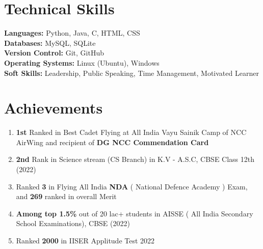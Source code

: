 \documentclass[a4paper,20pt]{article}
\begin{document}
\section{Technical Skills }
\vspace{2pt}

\textbf{Languages: }\hspace{0.1cm} \normalfont Python, Java, C, HTML, CSS\\
\textbf{Databases: }\hspace{0.1cm} \normalfont MySQL, SQLite\\
\textbf{Version Control: }\hspace{0.1cm} \normalfont Git, GitHub\\
\textbf{Operating Systems: }\hspace{0.1cm} \normalfont Linux (Ubuntu), Windows\\
\textbf{Soft Skills: }\hspace{0.1cm} \normalfont Leadership, Public Speaking, Time Management, Motivated Learner\\


\vspace{-5pt} 
\section{Achievements}
\vspace{2pt}

\begin{enumerate}
\item {\textbf{1st} Ranked in Best Cadet Flying at All India Vayu Sainik Camp of NCC AirWing and recipient of \textbf{DG NCC Commendation Card} }
\vspace{-5pt}
\item {\textbf{2nd }Rank in Science stream (CS Branch) in K.V - A.S.C, CBSE Class 12th (2022)}
\vspace{-5pt}
\item {Ranked \textbf{3} in Flying All India \textbf{NDA} ( National Defence Academy ) Exam, and \textbf{269} ranked in overall Merit }
\vspace{-5pt}
\item {\textbf{Among top 1.5\% }out of 20 lac+ students in AISSE ( All India Secondary School Examinations), CBSE (2022)}
\vspace{-5pt}
\item {Ranked \textbf{2000} in IISER Applitude Test 2022 }
\vspace{-5pt}
\end{enumerate}
\end{document}

